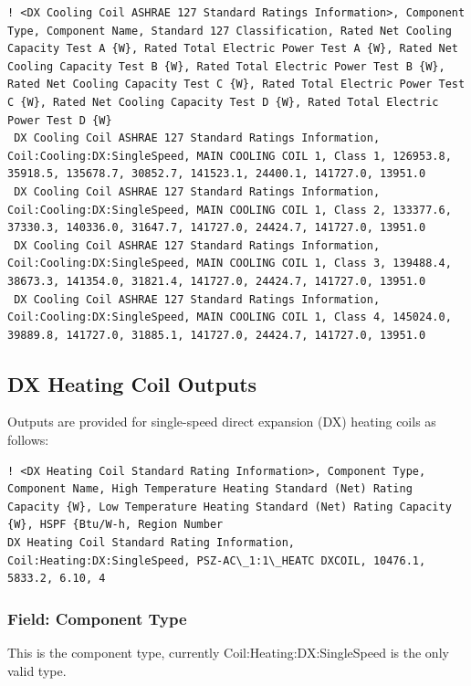 \begin{lstlisting}
! <DX Cooling Coil ASHRAE 127 Standard Ratings Information>, Component Type, Component Name, Standard 127 Classification, Rated Net Cooling Capacity Test A {W}, Rated Total Electric Power Test A {W}, Rated Net Cooling Capacity Test B {W}, Rated Total Electric Power Test B {W}, Rated Net Cooling Capacity Test C {W}, Rated Total Electric Power Test C {W}, Rated Net Cooling Capacity Test D {W}, Rated Total Electric Power Test D {W} 
 DX Cooling Coil ASHRAE 127 Standard Ratings Information, Coil:Cooling:DX:SingleSpeed, MAIN COOLING COIL 1, Class 1, 126953.8, 35918.5, 135678.7, 30852.7, 141523.1, 24400.1, 141727.0, 13951.0
 DX Cooling Coil ASHRAE 127 Standard Ratings Information, Coil:Cooling:DX:SingleSpeed, MAIN COOLING COIL 1, Class 2, 133377.6, 37330.3, 140336.0, 31647.7, 141727.0, 24424.7, 141727.0, 13951.0
 DX Cooling Coil ASHRAE 127 Standard Ratings Information, Coil:Cooling:DX:SingleSpeed, MAIN COOLING COIL 1, Class 3, 139488.4, 38673.3, 141354.0, 31821.4, 141727.0, 24424.7, 141727.0, 13951.0
 DX Cooling Coil ASHRAE 127 Standard Ratings Information, Coil:Cooling:DX:SingleSpeed, MAIN COOLING COIL 1, Class 4, 145024.0, 39889.8, 141727.0, 31885.1, 141727.0, 24424.7, 141727.0, 13951.0
\end{lstlisting}

\subsection{DX Heating Coil Outputs}\label{dx-heating-coil-outputs}

Outputs are provided for single-speed direct expansion (DX) heating coils as follows:

\begin{lstlisting}
! <DX Heating Coil Standard Rating Information>, Component Type, Component Name, High Temperature Heating Standard (Net) Rating Capacity {W}, Low Temperature Heating Standard (Net) Rating Capacity {W}, HSPF {Btu/W-h, Region Number
DX Heating Coil Standard Rating Information, Coil:Heating:DX:SingleSpeed, PSZ-AC\_1:1\_HEATC DXCOIL, 10476.1, 5833.2, 6.10, 4
\end{lstlisting}

\subsubsection{Field: Component Type}\label{field-component-type-5}

This is the component type, currently Coil:Heating:DX:SingleSpeed is the only valid type.

